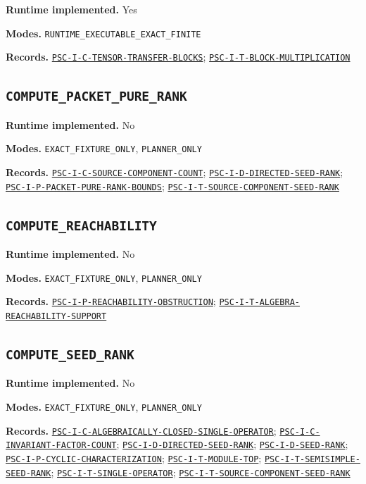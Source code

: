 \documentclass[a4paper,11pt]{article}
\newcommand{\field}[2]{\par\smallskip\noindent\textbf{#1.} #2\par}
\begin{document}
\field{Runtime implemented}{Yes}
\field{Modes}{\nolinkurl{RUNTIME_EXECUTABLE_EXACT_FINITE}}
\field{Records}{\hyperref[rec:PSC-I-C-TENSOR-TRANSFER-BLOCKS]{\nolinkurl{PSC-I-C-TENSOR-TRANSFER-BLOCKS}}; \hyperref[rec:PSC-I-T-BLOCK-MULTIPLICATION]{\nolinkurl{PSC-I-T-BLOCK-MULTIPLICATION}}}
\subsection*{\nolinkurl{COMPUTE_PACKET_PURE_RANK}}
\field{Runtime implemented}{No}
\field{Modes}{\nolinkurl{EXACT_FIXTURE_ONLY}, \nolinkurl{PLANNER_ONLY}}
\field{Records}{\hyperref[rec:PSC-I-C-SOURCE-COMPONENT-COUNT]{\nolinkurl{PSC-I-C-SOURCE-COMPONENT-COUNT}}; \hyperref[rec:PSC-I-D-DIRECTED-SEED-RANK]{\nolinkurl{PSC-I-D-DIRECTED-SEED-RANK}}; \hyperref[rec:PSC-I-P-PACKET-PURE-RANK-BOUNDS]{\nolinkurl{PSC-I-P-PACKET-PURE-RANK-BOUNDS}}; \hyperref[rec:PSC-I-T-SOURCE-COMPONENT-SEED-RANK]{\nolinkurl{PSC-I-T-SOURCE-COMPONENT-SEED-RANK}}}
\subsection*{\nolinkurl{COMPUTE_REACHABILITY}}
\field{Runtime implemented}{No}
\field{Modes}{\nolinkurl{EXACT_FIXTURE_ONLY}, \nolinkurl{PLANNER_ONLY}}
\field{Records}{\hyperref[rec:PSC-I-P-REACHABILITY-OBSTRUCTION]{\nolinkurl{PSC-I-P-REACHABILITY-OBSTRUCTION}}; \hyperref[rec:PSC-I-T-ALGEBRA-REACHABILITY-SUPPORT]{\nolinkurl{PSC-I-T-ALGEBRA-REACHABILITY-SUPPORT}}}
\subsection*{\nolinkurl{COMPUTE_SEED_RANK}}
\field{Runtime implemented}{No}
\field{Modes}{\nolinkurl{EXACT_FIXTURE_ONLY}, \nolinkurl{PLANNER_ONLY}}
\field{Records}{\hyperref[rec:PSC-I-C-ALGEBRAICALLY-CLOSED-SINGLE-OPERATOR]{\nolinkurl{PSC-I-C-ALGEBRAICALLY-CLOSED-SINGLE-OPERATOR}}; \hyperref[rec:PSC-I-C-INVARIANT-FACTOR-COUNT]{\nolinkurl{PSC-I-C-INVARIANT-FACTOR-COUNT}}; \hyperref[rec:PSC-I-D-DIRECTED-SEED-RANK]{\nolinkurl{PSC-I-D-DIRECTED-SEED-RANK}}; \hyperref[rec:PSC-I-D-SEED-RANK]{\nolinkurl{PSC-I-D-SEED-RANK}}; \hyperref[rec:PSC-I-P-CYCLIC-CHARACTERIZATION]{\nolinkurl{PSC-I-P-CYCLIC-CHARACTERIZATION}}; \hyperref[rec:PSC-I-T-MODULE-TOP]{\nolinkurl{PSC-I-T-MODULE-TOP}}; \hyperref[rec:PSC-I-T-SEMISIMPLE-SEED-RANK]{\nolinkurl{PSC-I-T-SEMISIMPLE-SEED-RANK}}; \hyperref[rec:PSC-I-T-SINGLE-OPERATOR]{\nolinkurl{PSC-I-T-SINGLE-OPERATOR}}; \hyperref[rec:PSC-I-T-SOURCE-COMPONENT-SEED-RANK]{\nolinkurl{PSC-I-T-SOURCE-COMPONENT-SEED-RANK}}}
\end{document}
